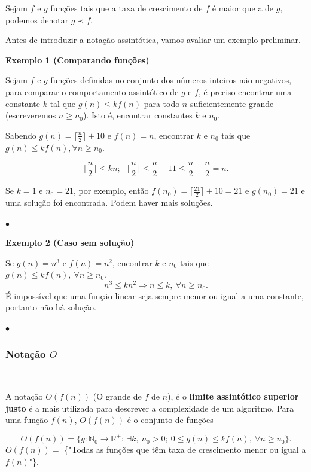 Sejam $f$ e $g$ funções tais que a taxa de crescimento de $f$ é maior que a de $g$, podemos denotar $g\prec f$.

Antes de introduzir a notação assintótica, vamos avaliar um exemplo preliminar.

\textbf{Exemplo 1 (Comparando funções)}

Sejam $f$ e $g$ funções definidas no conjunto dos números inteiros não negativos, para comparar o comportamento assintótico de $g$ e $f$, é preciso encontrar uma constante $k$ tal que $g(n)\leq kf(n)$ para todo $n$ suficientemente grande (escreveremos $n\geq n_0$). Isto é, encontrar constantes $k$ e $n_0$.

Sabendo $g(n)=\lceil\frac{n}{2}\rceil+10$ e $f(n)=n$, encontrar $k$ e $n_0$ tais que $g(n)\leq kf(n), \forall n\geq n_0$.

\[\Bigr\lceil \frac{n}{2} \Bigr\rceil \leq kn; \ \ \ \Bigr\lceil \frac{n}{2} \Bigr\rceil \leq \frac{n}{2} + 11 \leq \frac{n}{2} + \frac{n}{2} = n.\]

Se $k=1$ e $n_0=21$, por exemplo, então $f(n_0)=\lceil\frac{21}{2}\rceil+10 = 21$ e $g(n_0)=21$ e uma solução foi encontrada. Podem haver mais soluções.

{\raggedleft $\bullet$ \par}

\textbf{Exemplo 2 (Caso sem solução)}

Se $g(n)=n^3$ e $f(n)=n^2$, encontrar $k$ e $n_0$ tais que $g(n)\leq kf(n), \ \forall n\geq n_0$.
\[n^3\leq kn^2 \Rightarrow n\leq k, \ \forall n\geq n_0. \]
É impossível que uma função linear seja sempre menor ou igual a uma constante, portanto não há solução.

{\raggedleft $\bullet$ \par}

\subsubsection{Notação $O$}
\

A notação $O(f(n))$ (O grande de $f$ de $n$), é o \textbf{limite assintótico superior justo} é a mais utilizada para descrever a complexidade de um algoritmo. Para uma função $f(n)$, $O(f(n))$ é o conjunto de funções

\[O(f(n)) = \{g: \mathbb{N}_0 \rightarrow \mathbb{R}^{+}: \ \exists k, \ n_0 > 0 ; \ 0\leq g(n) \leq kf(n), \ \forall n \geq n_0\}.\]
$O(f(n))=$ \{"Todas as funções que têm taxa de crescimento menor ou igual a $f(n)$"\}.

